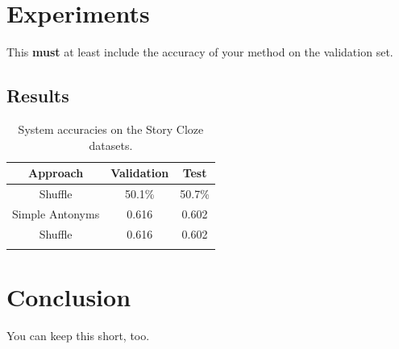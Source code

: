 \documentclass{article}
\begin{document}
\section{Experiments}
This {\bf must} at least include the accuracy of your method on the validation set.

\subsection{Results}
\begin{table}[h]
  \centering
  \begin{tabular}{ c c c}
    \toprule
    Approach & Validation & Test \\
    \midrule
    Shuffle & 50.1\% & 50.7\%\\
    Simple Antonyms & 0.616 & 0.602\\
    Shuffle & 0.616 & 0.602\\

    \bottomrule
    \\
  \end{tabular}
  \label{Tab:results}
  \caption{System accuracies on the Story Cloze datasets. }
\end{table}

\section{Conclusion}
You can keep this short, too.





\end{document}
